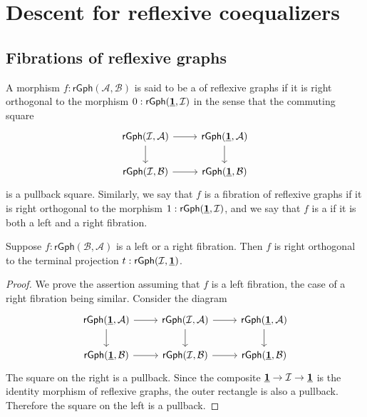 \section{Descent for reflexive coequalizers}\label{sec:descent_rcoeq}

\subsection{Fibrations of reflexive graphs}

\begin{defn}
A morphism $f:\mathsf{rGph}(\mathcal{A},\mathcal{B})$ is said to be a  of reflexive graphs if it is right orthogonal to the morphism $0:\mathsf{rGph}(\underline{\mathbf{1}},\mathcal{I})$ in the sense that the commuting square
\begin{equation*}
\begin{tikzcd}
\mathsf{rGph}(\mathcal{I},\mathcal{A}) \arrow[r] \arrow[d] & \mathsf{rGph}(\unit,\mathcal{A}) \arrow[d] \\
\mathsf{rGph}(\mathcal{I},\mathcal{B}) \arrow[r] & \mathsf{rGph}(\unit,\mathcal{B})
\end{tikzcd}
\end{equation*}
is a pullback square. Similarly, we say that $f$ is a  fibration of reflexive graphs if it is right orthogonal to the morphism $1:\mathsf{rGph}(\underline{\mathbf{1}},\mathcal{I})$, and we say that $f$ is a  if it is both a left and a right fibration.
\end{defn}

\begin{lem}\label{lem:leftfib_Inull}
Suppose $f:\mathsf{rGph}(\mathcal{B},\mathcal{A})$ is a left or a right fibration. Then $f$ is right orthogonal to the terminal projection $t:\mathsf{rGph}(\mathcal{I},\underline{\mathbf{1}})$.
\end{lem}

\begin{proof}
We prove the assertion assuming that $f$ is a left fibration, the case of a right fibration being similar. Consider the diagram
\begin{equation*}
\begin{tikzcd}
\mathsf{rGph}(\unit,\mathcal{A}) \arrow[d] \arrow[r] & \mathsf{rGph}(\mathcal{I},\mathcal{A}) \arrow[r] \arrow[d] & \mathsf{rGph}(\unit,\mathcal{A}) \arrow[d] \\
\mathsf{rGph}(\unit,\mathcal{B}) \arrow[r] & \mathsf{rGph}(\mathcal{I},\mathcal{B}) \arrow[r] & \mathsf{rGph}(\unit,\mathcal{B})
\end{tikzcd}
\end{equation*}
The square on the right is a pullback. Since the composite $\underline{\mathbf{1}} \to \mathcal{I}\to \underline{\mathbf{1}}$ is the identity morphism of reflexive graphs, the outer rectangle is also a pullback. Therefore the square on the left is a pullback.
\end{proof}

